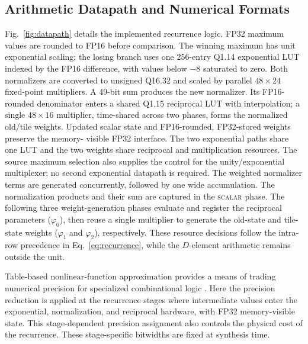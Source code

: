 \documentclass[journal]{IEEEtran}
\begin{document}
\subsection{Arithmetic Datapath and Numerical Formats}
Fig.~\ref{fig:datapath} details the implemented recurrence logic. FP32
maximum values are rounded to FP16 before comparison. The winning maximum
has unit exponential scaling; the losing branch uses one 256-entry Q1.14
exponential LUT indexed by the FP16 difference, with values below $-8$
saturated to zero. Both normalizers are converted to unsigned Q16.32 and
scaled by parallel $48\times24$ fixed-point multipliers. A 49-bit sum
produces the new normalizer. Its FP16-rounded denominator enters a shared
Q1.15 reciprocal LUT with interpolation; a single $48\times16$ multiplier,
time-shared across two phases, forms the normalized old/tile weights. Updated
scalar state and FP16-rounded, FP32-stored weights preserve the memory-
visible FP32 interface. The two exponential paths share one LUT and the
two weights share reciprocal and multiplication resources. The source
maximum selection also supplies the control for the unity/exponential
multiplexer; no second exponential datapath is required. The weighted
normalizer terms are generated concurrently, followed by one wide
accumulation. The normalization products and their sum are captured in the
\textsc{scalar} phase. The following three weight-generation phases
evaluate and register the reciprocal parameters ($\varphi_0$), then reuse
a single multiplier to generate the old-state and tile-state weights
($\varphi_1$ and $\varphi_2$), respectively. These resource decisions follow the intra-row
precedence in Eq.~\eqref{eq:recurrence}, while the $D$-element arithmetic
remains outside the unit.

Table-based nonlinear-function approximation provides a means of
trading numerical precision for specialized combinational logic
\cite{wu2025nonlinear}. Here the precision reduction is applied at the
recurrence stages where intermediate values enter the exponential,
normalization, and reciprocal hardware, with FP32 memory-visible state.
This stage-dependent precision assignment also controls the physical cost
of the recurrence. These stage-specific bitwidths are fixed at synthesis time.
\end{document}
